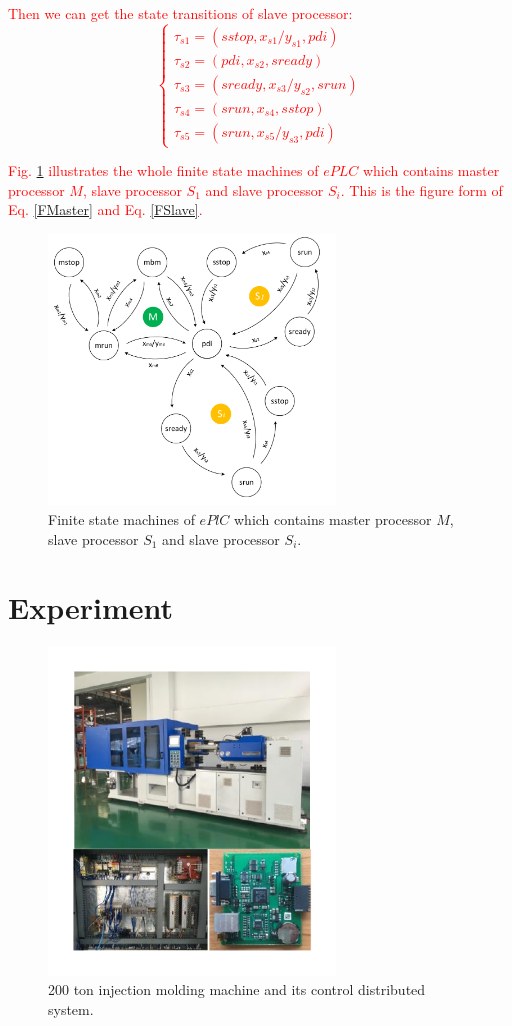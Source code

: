 \documentclass[journal,UTF8]{IEEEtran}
\begin{document}
 
 \textcolor{red}{Then we can get the state transitions of slave processor:
 \begin{equation}
 \left\{
 \begin{array}{l}
 \tau_{s1} = (sstop, x_{s1}/y_{s1}, pdi)\\
 \tau_{s2} = (pdi, x_{s2}, sready)\\
 \tau_{s3} = (sready, x_{s3}/y_{s2}, srun)\\
 \tau_{s4} = (srun, x_{s4}, sstop)\\
 \tau_{s5} = (srun, x_{s5}/y_{s3}, pdi)
 \end{array}
 \right.
 \end{equation}}

\textcolor{red}{Fig. \ref{fig:state} illustrates the whole finite state machines of $ePLC$ which contains master processor $M$, slave processor $S_1$ and slave processor $S_i$. This is the figure form of Eq. \ref{FMaster} and Eq. \ref{FSlave}. }
 \begin{figure}
	\centering
	\includegraphics[width=3in]{fig/state.pdf}
	\caption{ Finite state machines of $ePlC$ which contains master processor $M$, slave processor $S_1$ and slave processor $S_i$.}
	\label{fig:state}
\end{figure}
\section{Experiment}
\label{Experiment}

\begin{figure}
	\centering
	\includegraphics[width=3in]{fig/FIG10.pdf}
	\caption{200 ton injection molding machine and its control distributed system.}
	\label{fig:IMM}
\end{figure}
\end{document}
